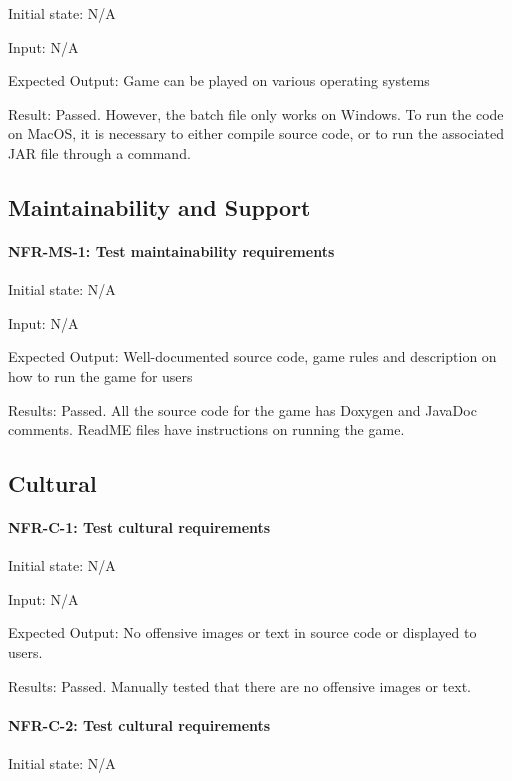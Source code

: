 \documentclass[12pt, titlepage]{article}
\begin{document}
Initial state: N/A

Input: N/A

Expected Output: Game can be played on various operating systems

Result: Passed. However, the batch file only works on Windows. To run the code on MacOS, it is necessary to either compile source code, or to run the associated JAR file through a command.

\subsection{Maintainability and Support}

\paragraph{NFR-MS-1: Test maintainability requirements\\}

Initial state: N/A

Input: N/A

Expected Output: Well-documented source code, game rules and description on how to run the game for users

Results: Passed. All the source code for the game has Doxygen and JavaDoc comments. ReadME files have instructions on running the game.

\subsection{Cultural}

\paragraph{NFR-C-1: Test cultural requirements\\}

Initial state: N/A

Input: N/A

Expected Output: No offensive images or text in source code or displayed to users.

Results: Passed. Manually tested that there are no offensive images or text.

\paragraph{NFR-C-2: Test cultural requirements\\}

Initial state: N/A
\end{document}
